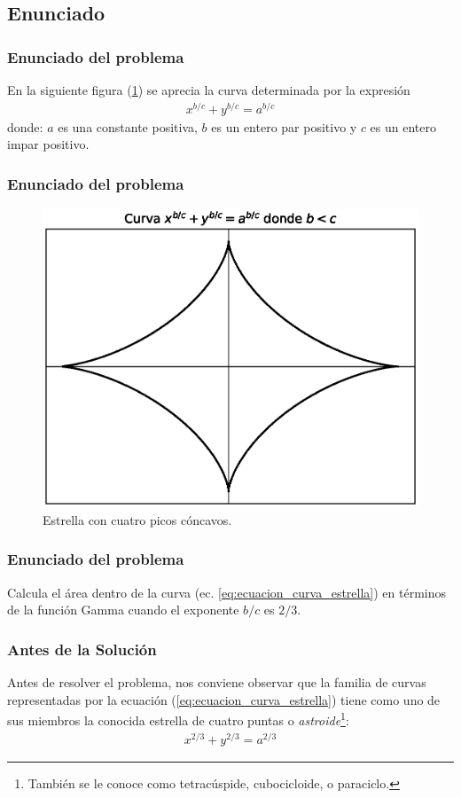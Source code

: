 \documentclass[12pt]{beamer}
\begin{document}
\subsection{Enunciado}

\begin{frame}
\frametitle{Enunciado del problema}
En la siguiente figura (\ref{fig:figura_curva_estrella}) se aprecia la curva determinada por la expresión
\begin{align}
x^{b/c} + y^{b/c} = a^{b/c}
\label{eq:ecuacion_curva_estrella}
\end{align}
donde: $a$ es una constante positiva, $b$ es un entero par positivo y $c$ es un entero impar positivo.
\end{frame}
\begin{frame}
\frametitle{Enunciado del problema}
\begin{figure}[H]
    \centering
    \includegraphics[scale=0.5]{Imagenes/plot_curva_estrella_01.eps}
    \caption{Estrella con cuatro picos cóncavos.}
    \label{fig:figura_curva_estrella}
\end{figure}
\end{frame}
\begin{frame}
\frametitle{Enunciado del problema}
Calcula el área dentro de la curva (ec. \ref{eq:ecuacion_curva_estrella}) en términos de la función Gamma cuando el exponente $b/c$ es $2/3$.
\end{frame}
\begin{frame}
\frametitle{Antes de la Solución}
Antes de resolver el problema, nos conviene observar que la familia de curvas representadas por la ecuación (\ref{eq:ecuacion_curva_estrella}) tiene como uno de sus miembros la conocida estrella de cuatro puntas o \emph{astroide}\footnote{También se le conoce como tetracúspide, cubocicloide, o paraciclo.}:
\begin{align*}
x^{2/3} + y^{2/3} = a^{2/3}
\end{align*}
\end{frame}
\end{document}
